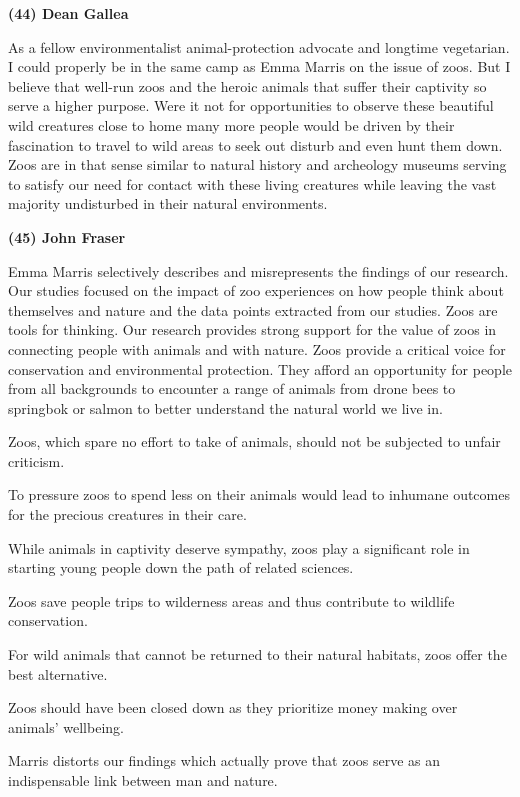\textbf{(44) Dean Gallea}

As a fellow environmentalist animal-protection advocate and longtime
vegetarian. I could properly be in the
same camp as Emma Marris on the issue of zoos. But I believe that
well-run zoos and the heroic animals that
suffer their captivity so serve a higher purpose. Were it not for
opportunities to observe these beautiful wild
creatures close to home many more people would be driven by their
fascination to travel to wild areas to seek out
disturb and even hunt them down.
Zoos are in that sense similar to natural history and archeology museums
serving to satisfy our need for contact
with these living creatures while leaving the vast majority undisturbed
in their natural environments.



\textbf{(45) John Fraser}

Emma Marris selectively describes and misrepresents the findings of our
research. Our studies focused on
the impact of zoo experiences on how people think about themselves and
nature and the data points extracted from
our studies. Zoos are tools for thinking. Our research provides strong
support for the value of zoos in connecting
people with animals and with nature. Zoos provide a critical voice for
conservation and environmental protection.
They afford an opportunity for people from all backgrounds to encounter
a range of animals from drone bees to
springbok or salmon to better understand the natural world we live in.


\begin{listmatch}
\item 
Zoos, which spare no effort to take of animals, should not be
subjected to unfair criticism.


\item 
To pressure zoos to spend less on their animals would lead to
inhumane outcomes for the precious creatures in
their care.


\item 
 While animals in captivity deserve sympathy, zoos play a
significant role in starting young people down the
path of related sciences.


\item 
 Zoos save people trips to wilderness areas and thus contribute
to wildlife conservation.


\item 
For wild animals that cannot be returned to their natural
habitats, zoos offer the best alternative.


\item 
Zoos should have been closed down as they prioritize money
making over animals' wellbeing.


\item 
Marris distorts our findings which actually prove that zoos
serve as an indispensable link between man and
nature.


\end{listmatch}

